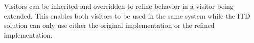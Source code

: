 Visitors can be inherited and overridden to refine behavior in a visitor
being extended. This enables both visitors to be used in the same system
while the ITD solution can only use either the original implementation 
or the refined implementation. 

